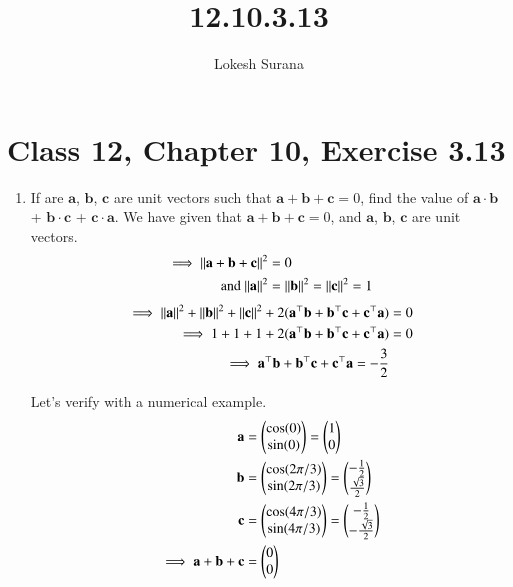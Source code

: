 \documentclass[journal,12pt,twocolumn]{IEEEtran}
\let\vec\mathbf
\begin{document}
\vspace{3cm}
\title{12.10.3.13}
\author{Lokesh Surana}
\maketitle
\section*{Class 12, Chapter 10, Exercise 3.13}
\begin{enumerate}[start=13]
\item  If are $\vec{a}$, $\vec{b}$, $\vec{c}$ are unit vectors such that $\vec{a} + \vec{b} + \vec{c} = {0}$, find the value of $\vec{a} \cdot \vec{b}$ + $\vec{b} \cdot \vec{c}$ + $\vec{c} \cdot \vec{a}$.
\break
\solution We have given that $\vec{a} + \vec{b} + \vec{c} = {0}$, and $\vec{a}$, $\vec{b}$, $\vec{c}$ are unit vectors.
\begin{align}
    \implies \norm{\vec{a} + \vec{b} + \vec{c}}^2 &=  0\\    
    \text{and } \norm{\vec{a}}^2 &= \norm{\vec{b}}^2 = \norm{\vec{c}}^2 = 1
\end{align}
\begin{align}
    \implies \norm{\vec{a}}^2 + \norm{\vec{b}}^2 + \norm{\vec{c}}^2 + 2(\vec{a}^{\top}\vec{b} + \vec{b}^{\top}\vec{c} + \vec{c}^{\top}\vec{a}) &= 0\\
    \implies 1 + 1 + 1 + 2(\vec{a}^{\top}\vec{b} + \vec{b}^{\top}\vec{c} + \vec{c}^{\top}\vec{a}) &= 0\\
    \implies \vec{a}^{\top}\vec{b} + \vec{b}^{\top}\vec{c} + \vec{c}^{\top}\vec{a} = -\frac{3}{2}
\end{align}

Let's verify with a numerical example.
\begin{align}
    \vec{a} &= \myvec{\cos(0)\\\sin(0)} = \myvec{1\\0} \\
    \vec{b} &= \myvec{\cos(2\pi/3)\\\sin(2\pi/3)} = \myvec{-\frac{1}{2}\\\frac{\sqrt{3}}{2}} \\
    \vec{c} &= \myvec{\cos(4\pi/3)\\\sin(4\pi/3)} = \myvec{-\frac{1}{2}\\-\frac{\sqrt{3}}{2}} \\
    \implies \vec{a} + \vec{b} + \vec{c} &= \myvec{0\\0} 
\end{align}


\end{enumerate}
\end{document}
